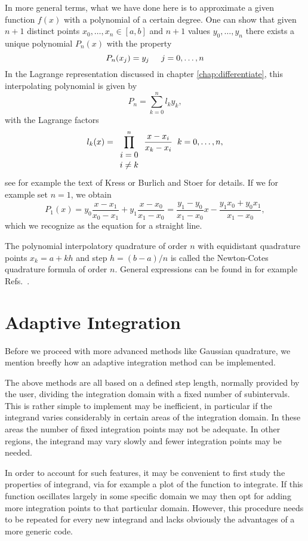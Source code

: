 In more general terms, what we have done here is to approximate a given function $f(x)$ with a polynomial
of a certain degree. One can show that 
given $n+1$ distinct points $x_0,\dots, x_n\in[a,b]$ and $n+1$ values $y_0,\dots,y_n$ there exists a 
unique polynomial $P_n(x)$ with the property 
\[
   P_n(x_j) = y_j\hspace{0.5cm} j=0,\dots,n
\]
In the Lagrange representation discussed in chapter \ref{chap:differentiate}, this interpolating polynomial is given by
\[
P_n = \sum_{k=0}^nl_ky_k,
\]
with the Lagrange factors
\[
   l_k(x) = \prod_{\begin{array}{c}i=0 \\ i\ne k\end{array}}^n\frac{x-x_i}{x_k-x_i}\hspace{0.2cm} k=0,\dots,n,
\]
see for example the text of Kress \cite{kress} or Burlich and Stoer \cite{st1983} for details.
If we for example set $n=1$, we obtain
\[
P_1(x) = y_0\frac{x-x_1}{x_0-x_1}+y_1\frac{x-x_0}{x_1-x_0}=\frac{y_1-y_0}{x_1-x_0}x-\frac{y_1x_0+y_0x_1}{x_1-x_0},
\]
which we recognize as the equation for a straight line.

The polynomial interpolatory quadrature of order $n$ with equidistant quadrature points $x_k=a+kh$
and step $h=(b-a)/n$ is called the Newton-Cotes quadrature formula of order $n$.
General expressions can be found in for example Refs.~\cite{kress,st1983}.

\section{Adaptive Integration}\label{sec:adaptive}
Before we proceed with more advanced methods like Gaussian quadrature, we mention breefly how
an adaptive integration method can be implemented.

The above methods are all based on a defined step length, normally provided by the user,
dividing the integration domain with a fixed number of subintervals.
This is rather simple to implement may be inefficient, in particular if the integrand
varies considerably in certain areas of the integration domain. In these areas the number of fixed integration points may not be adequate. In other regions, the integrand may vary slowly
and fewer integration points may be needed.

In order to account for such features, it may be convenient to first study the properties of
integrand, via for example a plot of the function to integrate. If this function
oscillates largely in some specific domain we may then opt for adding more integration points
to that particular domain. However, this procedure needs to be repeated for every new integrand and lacks obviously the advantages of a more generic code.  

